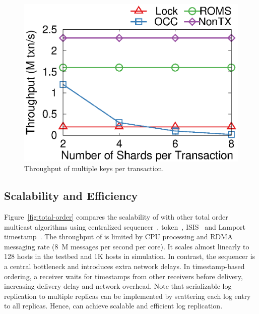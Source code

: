 \begin{figure}[t!]
\begin{minipage}{.31\textwidth}
		\centering
		\includegraphics[width=\textwidth]{gnuplot/multishard.eps}
		\caption{Throughput of multiple keys per transaction.}
		\label{fig:multishard}
    \end{minipage}
\end{figure}

\subsection{Scalability and Efficiency}


\label{subsubsec:scalability}
Figure~\ref{fig:total-order} compares the scalability of \sys with other total order multicast algorithms using centralized sequencer~\cite{eris,kaminsky2016design}, token~\cite{rajagopalan1989token}, ISIS~\cite{birman1985replication} and Lamport timestamp~\cite{lamport1978time}. The throughput of \sys is limited by CPU processing and RDMA messaging rate (8~M messages per second per core).
It scales almost linearly to 128 hosts in the testbed and 1K hosts in simulation. In contrast, the sequencer is a central bottleneck and introduces extra network delays. In timestamp-based ordering, a receiver waits for timestamps from other receivers before delivery, increasing delivery delay and network overhead. Note that serializable log replication to multiple replicas can be implemented by scattering each log entry to all replicas. Hence, \sys can achieve scalable and efficient log replication.







